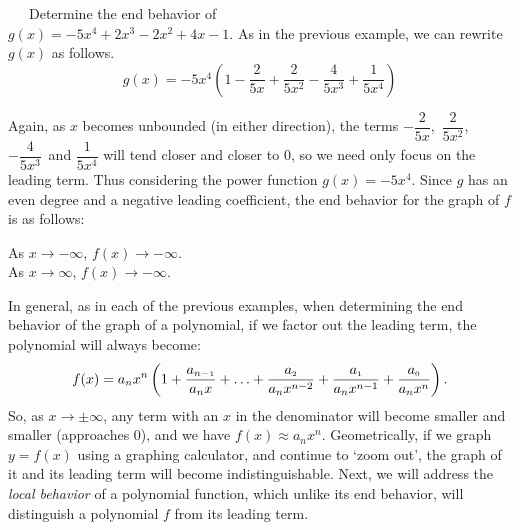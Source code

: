 \begin{example}~~~Determine the end behavior of\\ $g(x) = -5x^4 +2x^3 -2x^2+4x-1$.\pp
As in the previous example, we can rewrite $g(x)$ as follows.
$$g(x) = -5x^4 \left( 1 - \dfrac{2}{5x} + \dfrac{2}{5x^2} - \dfrac{4}{5x^3} +\dfrac{1}{5x^4} \right)$$

Again, as $x$ becomes unbounded (in either direction), the terms $- \dfrac{2}{5x}$,~$\dfrac{2}{5x^2}$,\\ $- \dfrac{4}{5x^3}$~and $\dfrac{1}{5x^4}$ will tend closer and closer to $0$, so we need only focus on the leading term.  Thus considering the power function $g(x)=-5x^4$. Since $g$ has an even degree and a negative leading coefficient, the end behavior for the graph of $f$ is as follows:
\begin{center}
As $x \rightarrow -\infty$, $f(x) \rightarrow -\infty$.\\
As $x \rightarrow \infty$, $f(x) \rightarrow -\infty$.
\end{center}
\end{example}

In general, as in each of the previous examples, when determining the end behavior of the graph of a polynomial, if we factor out the leading term, the polynomial will always become:
$$f(x) = a_{n} x^{n} \left( 1 + \dfrac{a_{n-\mbox{\tiny$1$}}}{a_{n} x}+ \ldots + \dfrac{a_{\mbox{\tiny$2$}}}{a_{n} x^{n-2}} + \dfrac{a_{\mbox{\tiny$1$}}}{a_{n} x^{n-1}}+\dfrac{a_{\mbox{\tiny$0$}}}{a_{n} x^{n}}\right).$$
So, as $x \rightarrow \pm \infty$, any term with an $x$ in the denominator will become smaller and smaller (approaches $0$), and we have $f(x) \approx a_{n} x^{n}$.\pp
Geometrically, if we graph $y=f(x)$ using a graphing calculator, and continue to `zoom out', the graph of it and its leading term will become indistinguishable.  Next, we will address the \textit{local behavior} of a polynomial function, which unlike its end behavior, will distinguish a polynomial $f$ from its leading term.